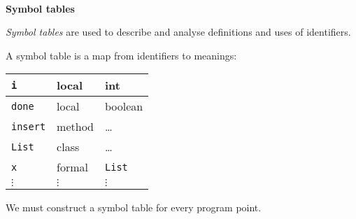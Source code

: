



\begin{slide*}
\begin{tabbing}
~\\
{\Huge\bf Symbol tables}\\
\end{tabbing}

\vspace{0.4in}

\begin{center}
\end{center}

\vfil
\end{slide*}

\begin{slide*}
{\em Symbol tables\/} are used to describe and analyse
definitions and uses of identifiers.

A symbol table is a map from identifiers to meanings:

\begin{scriptsize}
\begin{center}
\begin{tabular}{|l|l|l|}
\hline
{\tt i} & local & int \\\hline
{\tt done} & local & boolean\\\hline
{\tt insert} & method & \ldots\\\hline
{\tt List} & class & \ldots\\\hline
{\tt x} & formal & {\tt List}\\\hline
 $\vdots$ & $\vdots$ & $\vdots$\\
\end{tabular}
\end{center}
\end{scriptsize}

We must construct a symbol table for every program point.
\vfil
\end{slide*}
 
